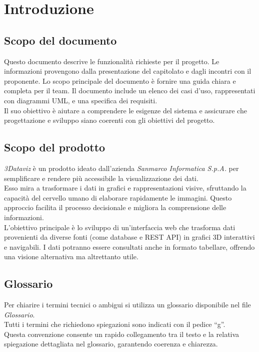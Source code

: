 \section{Introduzione}
\subsection{Scopo del documento}
Questo documento descrive le funzionalità richieste per il progetto.
Le informazioni provengono dalla presentazione del capitolato e dagli incontri con il proponente. 
Lo scopo principale del documento è fornire una guida chiara e completa per il team.
Il documento include un elenco dei casi d'uso, rappresentati con diagrammi UML, e una specifica dei requisiti.\\
Il suo obiettivo è aiutare a comprendere le esigenze del sistema e assicurare che progettazione e sviluppo siano coerenti con gli obiettivi del progetto.  

\subsection{Scopo del prodotto}
\textit{3Dataviz} è un prodotto ideato dall'azienda \textit{Sanmarco Informatica S.p.A.} per semplificare e rendere più accessibile la visualizzazione dei dati.\\
Esso mira a trasformare i dati in grafici e rappresentazioni visive, sfruttando la capacità del cervello umano di elaborare rapidamente le immagini. 
Questo approccio facilita il processo decisionale e migliora la comprensione delle informazioni.\\
L’obiettivo principale è lo sviluppo di un’interfaccia web che trasforma dati provenienti da diverse fonti (come database e REST API) in grafici 3D interattivi e navigabili. 
I dati potranno essere consultati anche in formato tabellare, offrendo una visione alternativa ma altrettanto utile.  

\subsection{Glossario}
Per chiarire i termini tecnici o ambigui si utilizza un glossario disponibile nel file \textit{Glossario}.\\
Tutti i termini che richiedono spiegazioni sono indicati con il pedice “g”. \\
Questa convenzione consente un rapido collegamento tra il testo e la relativa spiegazione dettagliata nel glossario, garantendo coerenza e chiarezza.

